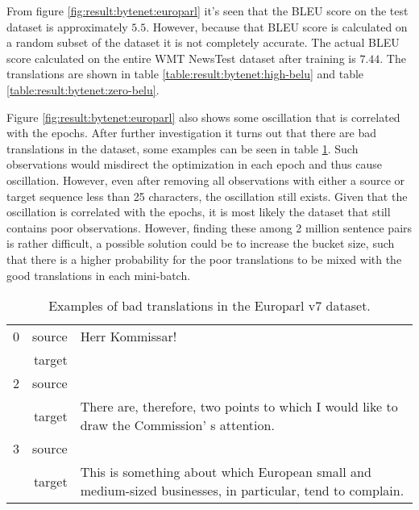From figure \ref{fig:result:bytenet:europarl} it's seen that the BLEU score on the test dataset is approximately $5.5$. However, because that BLEU score is calculated on a random subset of the dataset it is not completely accurate. The actual BLEU score calculated on the entire WMT NewsTest dataset after training is $7.44$. The translations are shown in table \ref{table:result:bytenet:high-belu} and table \ref{table:result:bytenet:zero-belu}.

Figure \ref{fig:result:bytenet:europarl} also shows some oscillation that is correlated with the epochs. After further investigation it turns out that there are bad translations in the dataset, some examples can be seen in table \ref{table:result:bytenet:bad-translations}. Such observations would misdirect the optimization in each epoch and thus cause oscillation. However, even after removing all observations with either a source or target sequence less than 25 characters, the oscillation still exists. Given that the oscillation is correlated with the epochs, it is most likely the dataset that still contains poor observations. However, finding these among 2 million sentence pairs is rather difficult, a possible solution could be to increase the bucket size, such that there is a higher probability for the poor translations to be mixed with the good translations in each mini-batch.

\begin{table}[h]
\centering
\begin{tabular}{l|r|p{10cm}}
0 & source & Herr Kommissar! \\[0.1cm]
  & target & \\[0.1cm] \hline
2 & source & \\[0.1cm]
  & target & There are, therefore, two points to which I would like to draw the Commission' s attention. \\[0.1cm]  \hline
3 & source & \\[0.1cm]
  & target & This is something about which European small and medium-sized businesses, in particular, tend to complain.
\end{tabular}
\caption{Examples of bad translations in the Europarl v7 dataset.}
\label{table:result:bytenet:bad-translations}
\end{table}

